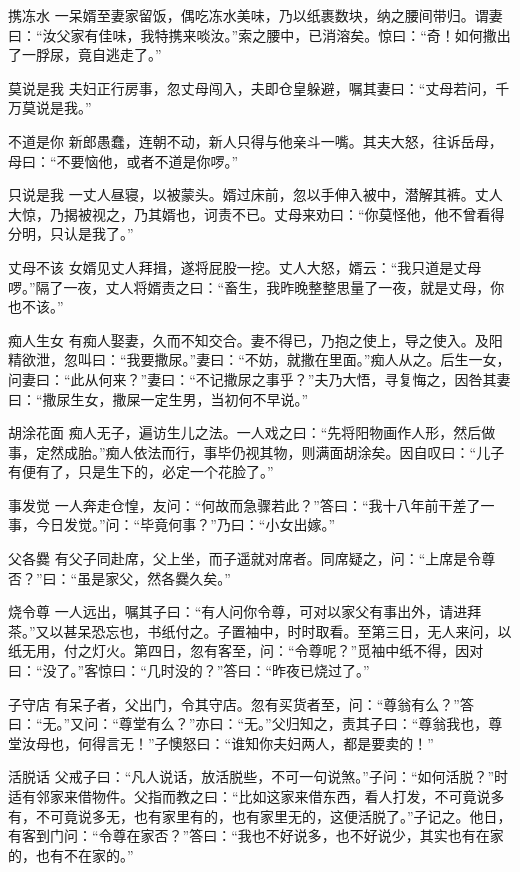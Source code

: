 \documentclass[12pt,UTF8]{ctexbook}
\begin{document}
携冻水
一呆婿至妻家留饭，偶吃冻水美味，乃以纸裹数块，纳之腰间带归。谓妻曰：“汝父家有佳味，我特携来啖汝。”索之腰中，已消溶矣。惊曰：“奇！如何撒出了一脬尿，竟自逃走了。”

莫说是我
夫妇正行房事，忽丈母闯入，夫即仓皇躲避，嘱其妻曰：“丈母若问，千万莫说是我。”

不道是你
新郎愚蠢，连朝不动，新人只得与他亲斗一嘴。其夫大怒，往诉岳母，母曰：“不要恼他，或者不道是你啰。”

只说是我
一丈人昼寝，以被蒙头。婿过床前，忽以手伸入被中，潜解其裤。丈人大惊，乃揭被视之，乃其婿也，诃责不已。丈母来劝曰：“你莫怪他，他不曾看得分明，只认是我了。”

丈母不该
女婿见丈人拜揖，遂将屁股一挖。丈人大怒，婿云：“我只道是丈母啰。”隔了一夜，丈人将婿责之曰：“畜生，我昨晚整整思量了一夜，就是丈母，你也不该。”

痴人生女
有痴人娶妻，久而不知交合。妻不得已，乃抱之使上，导之使入。及阳精欲泄，忽叫曰：“我要撒尿。”妻曰：“不妨，就撒在里面。”痴人从之。后生一女，问妻曰：“此从何来？”妻曰：“不记撒尿之事乎？”夫乃大悟，寻复悔之，因咎其妻曰：“撒尿生女，撒屎一定生男，当初何不早说。”

胡涂花面
痴人无子，遍访生儿之法。一人戏之曰：“先将阳物画作人形，然后做事，定然成胎。”痴人依法而行，事毕仍视其物，则满面胡涂矣。因自叹曰：“儿子有便有了，只是生下的，必定一个花脸了。”

事发觉
一人奔走仓惶，友问：“何故而急骤若此？”答曰：“我十八年前干差了一事，今日发觉。”问：“毕竟何事？”乃曰：“小女出嫁。”

父各爨
有父子同赴席，父上坐，而子遥就对席者。同席疑之，问：“上席是令尊否？”曰：“虽是家父，然各爨久矣。”

烧令尊
一人远出，嘱其子曰：“有人问你令尊，可对以家父有事出外，请进拜茶。”又以甚呆恐忘也，书纸付之。子置袖中，时时取看。至第三日，无人来问，以纸无用，付之灯火。第四日，忽有客至，问：“令尊呢？”觅袖中纸不得，因对曰：“没了。”客惊曰：“几时没的？”答曰：“昨夜已烧过了。”

子守店
有呆子者，父出门，令其守店。忽有买货者至，问：“尊翁有么？”答曰：“无。”又问：“尊堂有么？”亦曰：“无。”父归知之，责其子曰：“尊翁我也，尊堂汝母也，何得言无！”子懊怒曰：“谁知你夫妇两人，都是要卖的！”

活脱话
父戒子曰：“凡人说话，放活脱些，不可一句说煞。”子问：“如何活脱？”时适有邻家来借物件。父指而教之曰：“比如这家来借东西，看人打发，不可竟说多有，不可竟说多无，也有家里有的，也有家里无的，这便活脱了。”子记之。他日，有客到门问：“令尊在家否？”答曰：“我也不好说多，也不好说少，其实也有在家的，也有不在家的。”
\end{document}
